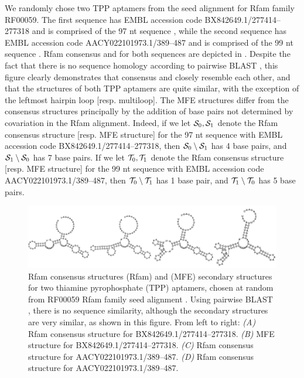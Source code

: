 We randomly chose two TPP \rb
aptamers from the seed alignment for
Rfam family RF00059. The first sequence has EMBL accession code
BX842649.1/277414--277318 and is comprised of the 97 nt sequence
, while the second sequence
has EMBL accession code AACY022101973.1/389--487 and is comprised of the 99
nt sequence
.
Rfam consensus and \mfess for both sequences are
depicted in .
Despite the fact that there is no sequence homology according to
pairwise BLAST \citep{blast}, this figure clearly demonstrates that
consensus and
\mfess closely resemble each other, and that the
structures of both TPP \rb aptamers are quite similar, with the
exception of the leftmost hairpin loop [resp. multiloop].
The MFE structures differ
from the consensus structures principally by the addition of base pairs not
determined by covariation in the Rfam alignment.
Indeed, if we let $\mathcal S_0,\mathcal S_1$
denote the Rfam consensus structure [resp. MFE structure] for the 97 nt
sequence with EMBL accession code BX842649.1/277414--277318, then
$\mathcal S_0 \setminus \mathcal S_1$ has 4 base pairs, and $\mathcal S_1 \setminus \mathcal S_0$
 has 7
base pairs. If we let $\mathcal T_0,\mathcal T_1$
denote the Rfam consensus structure [resp. MFE structure] for the 99 nt
sequence with EMBL accession code
AACY022101973.1/389--487, then
$\mathcal T_0 \setminus \mathcal T_1$ has 1 base pair, and $\mathcal T_1 \setminus \mathcal T_0$ has 5
base pairs.

\begin{figure}[!ht]
\centering
\includegraphics[width=.9\textwidth]{Figures/FFTbor/tppConsensusAndMfe.pdf}
\caption{Rfam consensus structures (Rfam) and \mfe (MFE)
secondary structures for two thiamine pyrophosphate (TPP) \rb aptamers,
chosen at random from RF00059 Rfam family seed alignment
\citep{Gardner.nar11}. Using pairwise BLAST \citep{blast}, there is no
sequence similarity, although the secondary structures are very similar,
as shown in this figure. From left to right:
{\em (A)} Rfam consensus structure for BX842649.1/277414--277318.
{\em (B)} MFE structure for BX842649.1/277414--277318.
{\em (C)} Rfam consensus structure for AACY022101973.1/389--487.
{\em (D)} Rfam consensus structure for AACY022101973.1/389--487.
}
\label{fig:fftbor:tppConsensusAndMfe}
\end{figure}

